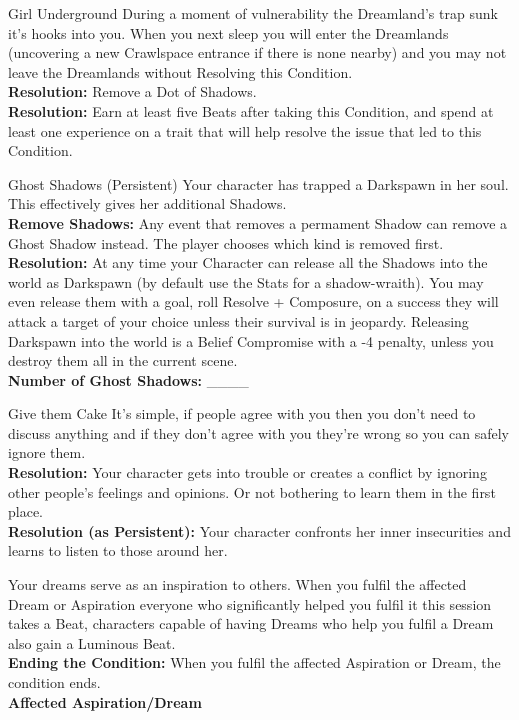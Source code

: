 \documentclass[10pt, frontgrid, backgrid]{flacards}
\begin{document}
\Cond
{Girl Underground}
{During a moment of vulnerability the Dreamland's trap sunk it's hooks into you. When you next sleep you will enter the Dreamlands (uncovering a new Crawlspace entrance if there is none nearby) and you may not leave the Dreamlands without Resolving this Condition. \\

\textbf{Resolution:} Remove a Dot of Shadows. \\
\textbf{Resolution:} Earn at least five Beats after taking this Condition, and spend at least one experience on a trait that will help resolve the issue that led to this Condition. }

\TCond
{Ghost Shadows (Persistent)}
{Your character has trapped a Darkspawn in her soul. This effectively gives her additional Shadows. \\
\textbf{Remove Shadows:} Any event that removes a permament Shadow can remove a Ghost Shadow instead. The player chooses which kind is removed first.\\
\textbf{Resolution:} At any time your Character can release all the Shadows into the world as Darkspawn (by default use the Stats for a shadow-wraith). You may even release them with a goal, roll Resolve + Composure, on a success they will attack a target of your choice unless their survival is in jeopardy. Releasing Darkspawn into the world is a Belief Compromise with a -4 penalty, unless you destroy them all in the current scene.\\ 
\textbf{Number of Ghost Shadows:} \_\_\_\_}

\Cond
{Give them Cake}
{It's simple, if people agree with you then you don't need to discuss anything and if they don't agree with you they're wrong so you can safely ignore them. \\
\textbf{Resolution:} Your character gets into trouble or creates a conflict by ignoring other people's feelings and opinions. Or not bothering to learn them in the first place.\\
\textbf{Resolution (as Persistent):} Your character confronts her inner insecurities and learns to listen to those around her.
}

{Your dreams serve as an inspiration to others. When you fulfil the affected Dream or Aspiration everyone who significantly helped you fulfil it this session takes a Beat, characters capable of having Dreams who help you fulfil a Dream also gain a Luminous Beat.\\

\textbf{Ending the Condition:} When you fulfil the affected Aspiration or Dream, the condition ends. \\
\textbf{Affected Aspiration/Dream} \fillunderline }
\end{document}
